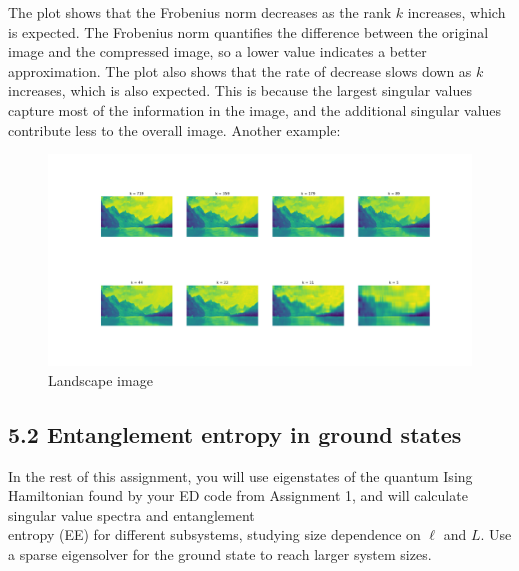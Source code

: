 \documentclass[12pt]{article}
\begin{document}
The plot shows that the Frobenius norm decreases as the rank $k$ increases, which is expected. The Frobenius norm quantifies the difference between the original image and the compressed image, so a lower value indicates a better approximation. The plot also shows that the rate of decrease slows down as $k$ increases, which is also expected. This is because the largest singular values capture most of the information in the image, and the additional singular values contribute less to the overall image.
Another example:
\begin{figure}
\centering
\includegraphics[width=\textwidth]{reconstructions_landscape.png}
\caption{Landscape image}
\end{figure}
\newpage
\subsection*{5.2 Entanglement entropy in ground states}
In the rest of this assignment, you will use eigenstates of the quantum Ising Hamiltonian found by your ED code from Assignment 1, and will calculate singular value spectra and entanglement\\
entropy (EE) for different subsystems, studying size dependence on $\ell$ and $L$. Use a sparse eigensolver for the ground state to reach larger system sizes.
\end{document}
